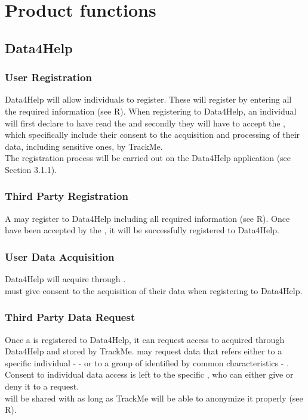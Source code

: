 \documentclass[../../rasd.tex]{subfiles}
\begin{document}
\section{Product functions}

	\subsection{Data4Help}
	
		\subsubsection{User Registration}
		Data4Help will allow individuals to register. These will register by entering all the required information (see R). When registering to Data4Help, an individual will first declare to have read the  and secondly they will have to accept the , which specifically include their consent to the acquisition and processing of their data, including sensitive ones, by TrackMe.\\
		The  registration process will be carried out on the Data4Help application (see Section 3.1.1).

		\subsubsection{Third Party Registration}
		A  may register to Data4Help including all required information (see R).
		Once  have been accepted by the , it will be successfully registered to Data4Help.

		\subsubsection{User Data Acquisition}
		Data4Help will acquire  through . \\
		 must give consent to the acquisition of their data when registering to Data4Help.\\

		\subsubsection{Third Party Data Request}
		Once a  is registered to Data4Help, it can request access to  acquired through Data4Help and stored by TrackMe.  may request data that refers either to a specific individual -  - or to a group of  identified by common characteristics - .\\
		Consent to individual data access is left to the specific , who can either give or deny it to a  request.\\
		 will be shared with  as long as TrackMe will be able to anonymize it properly (see R).
\end{document}
